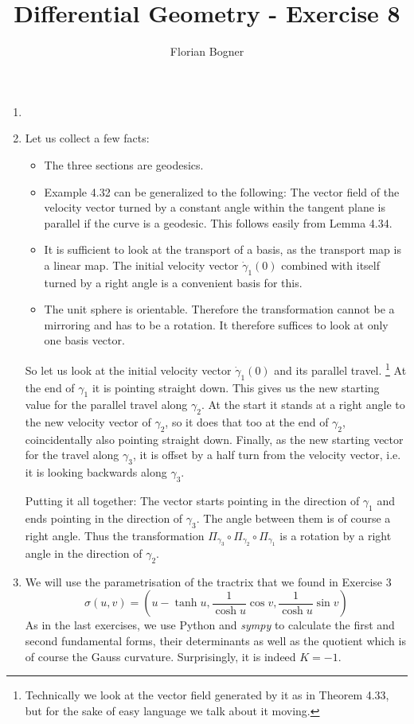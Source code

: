 \documentclass[a4paper,11pt,notitlepage,fullpage]{article}
\begin{document}
\author{Florian Bogner}
\title{Differential Geometry - Exercise 8}
\maketitle


\begin{enumerate}
\item

\item Let us collect a few facts:
\begin{itemize}
\item The three sections are geodesics.
\item Example 4.32 can be generalized to the following: The vector field of the velocity vector turned by a constant angle within the tangent plane is parallel if the curve is a geodesic. This follows easily from Lemma 4.34.
\item It is sufficient to look at the transport of a basis, as the transport map is a linear map. The initial velocity vector $\dot\gamma_1(0)$ combined with itself turned by a right angle is a convenient basis for this.
\item The unit sphere is orientable. Therefore the transformation cannot be a mirroring and has to be a rotation. It therefore suffices to look at only one basis vector.
\end{itemize}

So let us look at the initial velocity vector $\dot\gamma_1(0)$ and its parallel travel. \footnote{Technically we look at the vector field generated by it as in Theorem 4.33, but for the sake of easy language we talk about it moving.} At the end of $\gamma_1$ it is pointing straight down. This gives us the new starting value for the parallel travel along $\gamma_2$. At the start it stands at a right angle to the new velocity vector of $\gamma_2$, so it does that too at the end of $\gamma_2$, coincidentally also pointing straight down. Finally, as the new starting vector for the travel along $\gamma_3$, it is offset by a half turn from the velocity vector, i.e. it is looking backwards along $\gamma_3$.

Putting it all together: The vector starts pointing in the direction of $\gamma_1$ and ends pointing in the direction of $\gamma_3$. The angle between them is of course a right angle. Thus the transformation $\Pi_{\gamma_3} \circ \Pi_{\gamma_2} \circ \Pi_{\gamma_1}$ is a rotation by a right angle in the direction of $\gamma_2$.

\item We will use the parametrisation of the tractrix that we found in Exercise 3
\begin{equation*}
\sigma(u,v) = (u - \tanh u, \frac{1}{\cosh u} \cos v, \frac{1}{\cosh u} \sin v)
\end{equation*}
As in the last exercises, we use Python and \emph{sympy} to calculate the first and second fundamental forms, their determinants as well as the quotient which is of course the Gauss curvature. Surprisingly, it is indeed $K = -1$. 


\end{enumerate}
\end{document}
